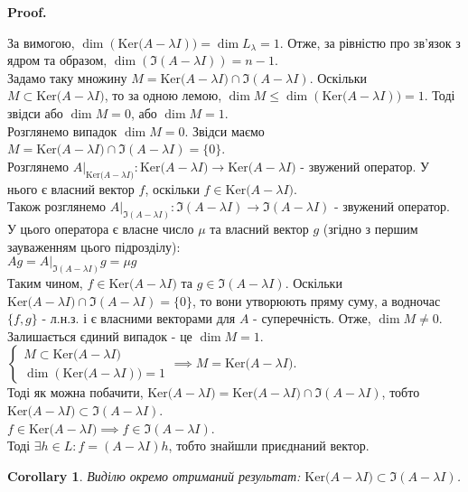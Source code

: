 \documentclass[a4paper, 10pt]{article}
\makeatletter
\def\qed{$\blacksquare$}
\def\ker#1{\textrm{Ker} {#1}}
\theoremstyle{theoremdd}
\theoremstyle{theoremdd}
\theoremstyle{theoremdd}
\theoremstyle{theoremdd}
\theoremstyle{theoremdd}
\theoremstyle{theoremdd}
\theoremstyle{theoremdd}
\theoremstyle{theoremdd}
\newtheorem{corollary}[theorem]{Corollary}
\renewenvironment{proof}[1][Proof.\\]{\par
\pushQED{\hfill \qed}%
\normalfont \topsep6\p@\@plus6\p@\relax
\trivlist
\item\relax
{\bfseries
#1\@addpunct{.}}\hspace\labelsep\ignorespaces
}{%
\popQED\endtrivlist\@endpefalse
}
\makeatother
\begin{document}
\begin{proof}
За вимогою, $\dim (\ker(A - \lambda I)) = \dim L_{\lambda} = 1$. Отже, за рівністю про зв'язок з ядром та образом, $\dim (\Im (A - \lambda I)) = n-1$.\\
Задамо таку множину $M=\ker(A-\lambda I) \cap \Im(A-\lambda I)$. Оскільки $M \subset \ker (A-\lambda I)$, то за одною лемою, $\dim M \leq \dim(\ker (A-\lambda I)) = 1$.
Тоді звідси або $\dim M = 0$, або $\dim M = 1$.
\bigskip \\
Розглянемо випадок $\dim M = 0$. Звідси маємо $M = \ker(A-\lambda I) \cap \Im(A-\lambda I) = \{0\}$.\\
Розглянемо $A |_{\ker(A-\lambda I)}: \ker(A-\lambda I) \to \ker(A-\lambda I)$ - звужений оператор. У нього є власний вектор $f$, оскільки $f \in \ker (A-\lambda I)$.\\
Також розглянемо $A |_{\Im(A-\lambda I)}: \Im(A-\lambda I) \to \Im(A-\lambda I)$ - звужений оператор. У цього оператора є власне число $\mu$ та власний вектор $g$ (згідно з першим зауваженням цього підрозділу):\\
$Ag = A |_{\Im(A-\lambda I)} g = \mu g$\\
Таким чином, $f \in \ker(A-\lambda I)$ та $g \in \Im(A-\lambda I)$. Оскільки $\ker ( A-\lambda I ) \cap \Im ( A - \lambda I ) = \{ 0 \}$, то вони утворюють пряму суму, а водночас $\{f,g\}$ - л.н.з. і є власними векторами для $A$ - суперечність. Отже, $\dim M \neq 0$.
\bigskip \\
Залишається єдиний випадок - це $\dim M = 1$.\\
$\begin{cases}
M \subset \ker(A-\lambda I)\\
\dim{(\ker(A-\lambda I))} = 1
\end{cases}
\implies M = \ker(A-\lambda I)$.
\bigskip \\
Тоді як можна побачити, $\ker(A-\lambda I) = \ker(A-\lambda I) \cap \Im (A - \lambda I)$, тобто $\ker(A-\lambda I) \subset \Im(A-\lambda I)$.\\
$f \in \ker (A- \lambda I) \implies f \in \Im(A - \lambda I)$.\\
Тоді $\exists h \in L: f = (A-\lambda I)h$, тобто знайшли приєднаний вектор.
\end{proof}

\begin{corollary}
Виділю окремо отриманий результат: $\ker (A-\lambda I) \subset \Im (A - \lambda I)$.
\end{corollary}
\end{document}

